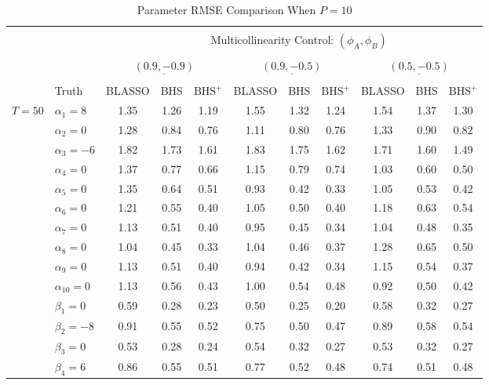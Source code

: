 \begin{table}[htbp]
\scriptsize
\centering
\caption{Parameter RMSE Comparison When $P=10$}
\begin{tabular}{ll|ccc|ccc|ccc}
\hline
  \multicolumn{2}{c|}{} & \multicolumn{9}{c}{}\\
  & & & \multicolumn{7}{c}{Multicollinearity Control: $(\phi_A,\phi_B)$} &  \\
  \multicolumn{2}{c|}{} & \multicolumn{9}{c}{}\\
   & & \multicolumn{3}{c}{$\underline{(0.9 ,-0.9)} $} & \multicolumn{3}{c}{$\underline{(0.9 ,-0.5)} $} & \multicolumn{3}{c}{$\underline{(0.5 ,-0.5)} $}   \\
  \multicolumn{2}{c|}{} & \multicolumn{9}{c}{}\\
& Truth & BLASSO & BHS & $\textrm{BHS}^+$ & BLASSO & BHS & $\textrm{BHS}^+$ & BLASSO & BHS & $\textrm{BHS}^+$ \\ 
  \hline
 \multirow{20}{*}{$T=50$} & $\alpha_1=8$ & 1.35 & 1.26 & 1.19 & 1.55 & 1.32 & 1.24 & 1.54 & 1.37 & 1.30 \\ 
  & $\alpha_2=0$ & 1.28 & 0.84 & 0.76 & 1.11 & 0.80 & 0.76 & 1.33 & 0.90 & 0.82 \\ 
  & $\alpha_3=-6$ & 1.82 & 1.73 & 1.61 & 1.83 & 1.75 & 1.62 & 1.71 & 1.60 & 1.49 \\ 
  & $\alpha_4=0$ & 1.37 & 0.77 & 0.66 & 1.15 & 0.79 & 0.74 & 1.03 & 0.60 & 0.50 \\ 
  & $\alpha_5=0$ & 1.35 & 0.64 & 0.51 & 0.93 & 0.42 & 0.33 & 1.05 & 0.53 & 0.42 \\ 
  & $\alpha_6=0$ & 1.21 & 0.55 & 0.40 & 1.05 & 0.50 & 0.40 & 1.18 & 0.63 & 0.54 \\ 
  & $\alpha_7=0$ & 1.13 & 0.51 & 0.40 & 0.95 & 0.45 & 0.34 & 1.04 & 0.48 & 0.35 \\ 
  & $\alpha_8=0$ & 1.04 & 0.45 & 0.33 & 1.04 & 0.46 & 0.37 & 1.28 & 0.65 & 0.50 \\ 
  & $\alpha_9=0$ & 1.13 & 0.51 & 0.40 & 0.94 & 0.42 & 0.34 & 1.15 & 0.54 & 0.37 \\ 
  & $\alpha_{10}=0$ &  1.13 & 0.56 & 0.43 & 1.00 & 0.54 & 0.48 & 0.92 & 0.50 & 0.42 \\ 
  & $\beta_1=0$ & 0.59 & 0.28 & 0.23 & 0.50 & 0.25 & 0.20 & 0.58 & 0.32 & 0.27 \\ 
  & $\beta_2=-8$ &  0.91 & 0.55 & 0.52 & 0.75 & 0.50 & 0.47 & 0.89 & 0.58 & 0.54 \\ 
  & $\beta_3=0$ & 0.53 & 0.28 & 0.24 & 0.54 & 0.32 & 0.27 & 0.53 & 0.32 & 0.27 \\ 
  & $\beta_4=6$ & 0.86 & 0.55 & 0.51 & 0.77 & 0.52 & 0.48 & 0.74 & 0.51 & 0.48 \\ 

\end{tabular}
\end{table}
